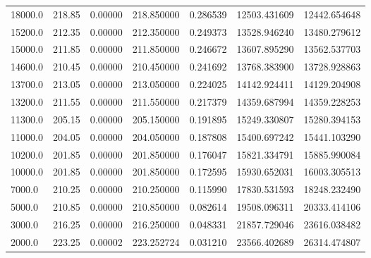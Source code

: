 \begin{tabular}{lllllll}
   18000.0 &   218.85 & 0.00000 &    218.850000 &          0.286539 & 12503.431609 & 12442.654648 \\
   15200.0 &   212.35 & 0.00000 &    212.350000 &          0.249373 & 13528.946240 & 13480.279612 \\
   15000.0 &   211.85 & 0.00000 &    211.850000 &          0.246672 & 13607.895290 & 13562.537703 \\
   14600.0 &   210.45 & 0.00000 &    210.450000 &          0.241692 & 13768.383900 & 13728.928863 \\
   13700.0 &   213.05 & 0.00000 &    213.050000 &          0.224025 & 14142.924411 & 14129.204908 \\
   13200.0 &   211.55 & 0.00000 &    211.550000 &          0.217379 & 14359.687994 & 14359.228253 \\
   11300.0 &   205.15 & 0.00000 &    205.150000 &          0.191895 & 15249.330807 & 15280.394153 \\
   11000.0 &   204.05 & 0.00000 &    204.050000 &          0.187808 & 15400.697242 & 15441.103290 \\
   10200.0 &   201.85 & 0.00000 &    201.850000 &          0.176047 & 15821.334791 & 15885.990084 \\
   10000.0 &   201.85 & 0.00000 &    201.850000 &          0.172595 & 15930.652031 & 16003.305513 \\
    7000.0 &   210.25 & 0.00000 &    210.250000 &          0.115990 & 17830.531593 & 18248.232490 \\
    5000.0 &   210.85 & 0.00000 &    210.850000 &          0.082614 & 19508.096311 & 20333.414106 \\
    3000.0 &   216.25 & 0.00000 &    216.250000 &          0.048331 & 21857.729046 & 23616.038482 \\
    2000.0 &   223.25 & 0.00002 &    223.252724 &          0.031210 & 23566.402689 & 26314.474807 \\
\bottomrule
\end{tabular}

